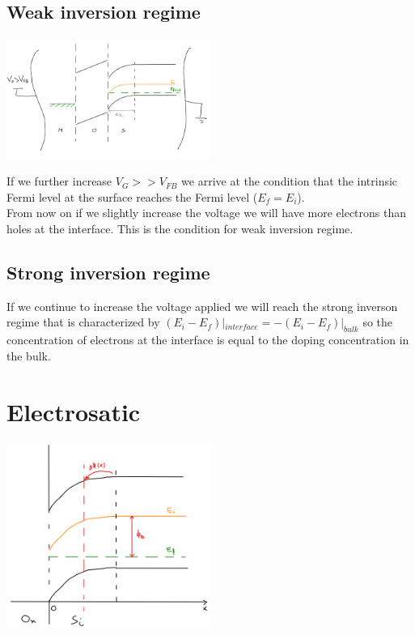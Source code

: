 \subsection{Weak inversion regime}

\centering
\includegraphics[width=0.5\textwidth]{mos_weak.png}\\
\raggedright

If we further increase $V_G>>V_{FB}$ we arrive at the condition that the intrinsic Fermi level at the surface reaches the Fermi level ($E_f=E_i$).\\
From now on if we slightly increase the voltage we will have more electrons than holes at the interface. This is the condition for weak inversion regime.\\

\subsection{Strong inversion regime}

If we continue to increase the voltage applied we will reach the strong inverson regime that is characterized by $(E_i-E_f)|_{interface}=-(E_i-E_f)|_{bulk}$ so the concentration of electrons at the interface is equal to the doping concentration in the bulk.

\section{Electrosatic}

\centering
\includegraphics[width=0.5\textwidth]{mos_electrostatic.png}\\
\raggedright

